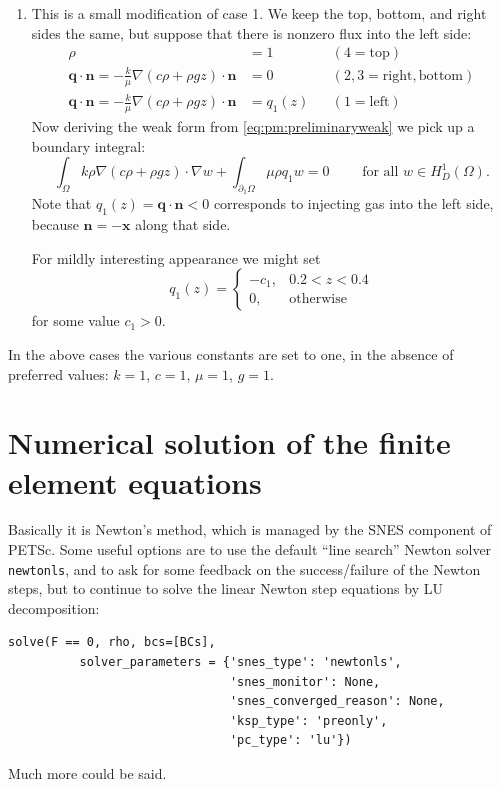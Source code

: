 \documentclass[11pt]{article}
\newcommand{\bn}{\mathbf{n}}
\newcommand{\bq}{\mathbf{q}}
\newcommand{\bx}{\mathbf{x}}
\newcommand{\grad}{\nabla}
\begin{document}
\begin{enumerate}
\item This is a small modification of case 1.  We keep the top, bottom, and right sides the same, but suppose that there is nonzero flux into the left side:
\begin{subequations}
\begin{align}
\rho &= 1 & &(4=\text{top}) \label{eq:twobc:dirichlet} \\
\bq \cdot \bn = - \frac{k}{\mu} \grad(c\rho + \rho g z) \cdot \bn &= 0 & &(2,3=\text{right},\text{bottom}) \label{eq:twobc:noflux} \\
\bq \cdot \bn = - \frac{k}{\mu} \grad(c\rho + \rho g z) \cdot \bn &= q_1(z) & &(1=\text{left}) \label{eq:twobc:givenflux}
\end{align}
\end{subequations}
Now deriving the weak form from \eqref{eq:pm:preliminaryweak} we pick up a boundary integral:
\begin{equation}
\int_\Omega k \rho \grad\left(c\rho + \rho g z\right) \cdot \grad w + \int_{\partial_1\Omega} \mu \rho q_1 w = 0 \qquad \text{ for all } w \in H_D^1(\Omega).\label{eq:pm:weaktwo}
\end{equation}
Note that $q_1(z) = \bq \cdot \bn < 0$ corresponds to injecting gas into the left side, because $\bn = -\bx$ along that side.

For mildly interesting appearance we might set
	$$q_1(z) = \begin{cases} -c_1, & 0.2 < z < 0.4 \\ 0, & \text{otherwise} \end{cases}$$
for some value $c_1>0$.
\end{enumerate}

In the above cases the various constants are set to one, in the absence of preferred values: $k=1$, $c=1$, $\mu=1$, $g=1$.



\section{Numerical solution of the finite element equations}

Basically it is Newton's method, which is managed by the SNES component of PETSc.  Some useful options are to use the default ``line search'' Newton solver \texttt{newtonls}, and to ask for some feedback on the success/failure of the Newton steps, but to continue to solve the linear Newton step equations by LU decomposition:
\begin{Verbatim}[fontsize=\small]
    solve(F == 0, rho, bcs=[BCs],
          solver_parameters = {'snes_type': 'newtonls',
                               'snes_monitor': None,
                               'snes_converged_reason': None,
                               'ksp_type': 'preonly',
                               'pc_type': 'lu'})
\end{Verbatim}
Much more could be said.
\end{document}

